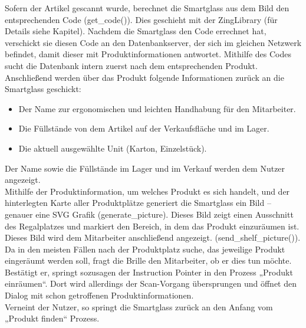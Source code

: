 Sofern der Artikel gescannt wurde, berechnet die Smartglass aus dem Bild den entsprechenden Code (get\_code()). Dies geschieht mit der ZingLibrary (für Details siehe Kapitel). Nachdem die Smartglass den Code errechnet hat, verschickt sie diesen Code an den Datenbankserver, der sich im gleichen Netzwerk befindet, damit dieser mit Produktinformationen antwortet. Mithilfe des Codes sucht die Datenbank intern zuerst nach dem entsprechenden Produkt. Anschließend werden über das Produkt folgende Informationen zurück an die Smartglass geschickt:
\begin{itemize}
	\item Der Name zur ergonomischen und leichten Handhabung für den Mitarbeiter.
	\item Die Füllstände von dem Artikel auf der Verkaufsfläche und im  Lager.
	\item Die aktuell ausgewählte Unit (Karton, Einzelstück).
\end{itemize}
Der Name sowie die Füllstände im Lager und im Verkauf werden dem Nutzer angezeigt.\\

Mithilfe der Produktinformation, um welches Produkt es sich handelt, und der hinterlegten Karte aller Produktplätze generiert die Smartglass ein Bild – genauer eine SVG Grafik (generate\_picture). Dieses Bild zeigt einen Ausschnitt des Regalplatzes und markiert den Bereich, in dem das Produkt einzuräumen ist. Dieses Bild wird dem Mitarbeiter anschließend angezeigt. (send\_shelf\_picture()).
\\
Da in den meisten Fällen nach der Produktplatz suche, das jeweilige Produkt eingeräumt werden soll, fragt die Brille den Mitarbeiter, ob er dies tun möchte. 
Bestätigt er, springt sozusagen der Instruction Pointer in den Prozess „Produkt einräumen“. Dort wird allerdings der Scan-Vorgang übersprungen und öffnet den Dialog mit schon getroffenen Produktinformationen. 
\\
Verneint der Nutzer, so springt die Smartglass zurück an den Anfang vom „Produkt finden“ Prozess. 

